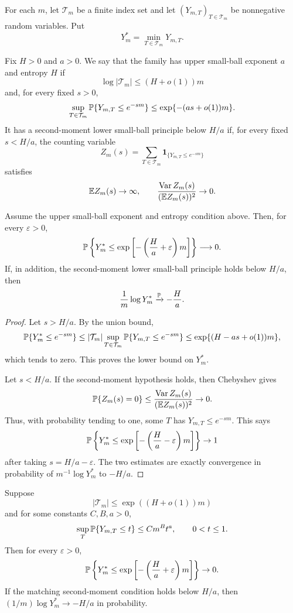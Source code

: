 For each \(m\), let \(\mathcal T_m\) be a finite index set and let
\((Y_{m,T})_{T\in\mathcal T_m}\) be nonnegative random variables.  Put
\[
  Y_m^*=\min_{T\in\mathcal T_m}Y_{m,T}.
\]

\begin{definition}
Fix \(H>0\) and \(a>0\).  We say that the family has upper small-ball exponent
\(a\) and entropy \(H\) if
\[
  \log |\mathcal T_m|\le (H+o(1))m
\]
and, for every fixed \(s>0\),
\[
  \sup_{T\in\mathcal T_m}
  \mathbb{P}\{Y_{m,T}\le e^{-sm}\}
  \le \exp\{-(as+o(1))m\}.
\]
It has a second-moment lower small-ball principle below \(H/a\) if, for every
fixed \(s<H/a\), the counting variable
\[
  Z_m(s)=\sum_{T\in\mathcal T_m}\mathbf{1}_{\{Y_{m,T}\le e^{-sm}\}}
\]
satisfies
\[
  \mathbb{E} Z_m(s)\to\infty,
  \qquad
  \frac{\operatorname{Var} Z_m(s)}{(\mathbb{E} Z_m(s))^2}\to0.
\]
\end{definition}

\begin{theorem}\label{thm:principle}
Assume the upper small-ball exponent and entropy condition above.  Then, for
every \(\varepsilon>0\),
\[
  \mathbb{P}\left\{Y_m^*\le \exp\left[-\left(\frac{H}{a}+\varepsilon\right)m\right]\right\}
  \longrightarrow 0.
\]
If, in addition, the second-moment lower small-ball principle holds below
\(H/a\), then
\[
  \frac{1}{m}\log Y_m^*\xrightarrow{\mathbb{P}}-\frac{H}{a}.
\]
\end{theorem}

\begin{proof}
Let \(s>H/a\).  By the union bound,
\[
  \mathbb{P}\{Y_m^*\le e^{-sm}\}
  \le |\mathcal T_m|
      \sup_{T\in\mathcal T_m}\mathbb{P}\{Y_{m,T}\le e^{-sm}\}
  \le \exp\{(H-as+o(1))m\},
\]
which tends to zero.  This proves the lower bound on \(Y_m^*\).

Let \(s<H/a\).  If the second-moment hypothesis holds, then Chebyshev gives
\[
  \mathbb{P}\{Z_m(s)=0\}
  \le \frac{\operatorname{Var} Z_m(s)}{(\mathbb{E} Z_m(s))^2}\to0.
\]
Thus, with probability tending to one, some \(T\) has \(Y_{m,T}\le e^{-sm}\).
This says
\[
  \mathbb{P}\left\{Y_m^*\le \exp\left[-\left(\frac{H}{a}-\varepsilon\right)m\right]\right\}
  \to1
\]
after taking \(s=H/a-\varepsilon\).  The two estimates are exactly convergence
in probability of \(m^{-1}\log Y_m^*\) to \(-H/a\).
\end{proof}

\begin{corollary}\label{cor:poly-smallball}
Suppose
\[
  |\mathcal T_m|\le \exp((H+o(1))m)
\]
and for some constants \(C,B,a>0\),
\[
  \sup_T\mathbb{P}\{Y_{m,T}\le t\}\le C m^B t^a,\qquad 0<t\le1.
\]
Then for every \(\varepsilon>0\),
\[
  \mathbb{P}\left\{Y_m^*\le \exp\left[-\left(\frac{H}{a}+\varepsilon\right)m\right]\right\}
  \to0.
\]
If the matching second-moment condition holds below \(H/a\), then
\((1/m)\log Y_m^*\to-H/a\) in probability.
\end{corollary}

